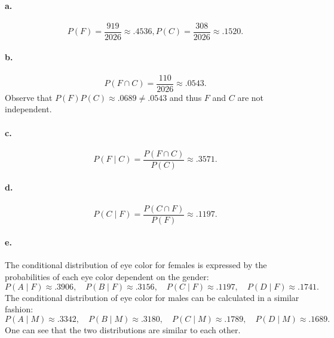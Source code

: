\documentclass{exam}
\begin{document}
\paragraph{a.}
\[
	P(F) = \frac{919}{2026} \approx .4536, P(C) = \frac{308}{2026} \approx .1520.
\]

\paragraph{b.}
\[
	P(F \cap C) = \frac{110}{2026} \approx .0543.
\]
Observe that $P(F)P(C) \approx .0689 \neq .0543$ and thus $F$ and $C$ are not independent.

\paragraph{c.}
\[
	P(F \mid C) = \frac{P(F \cap C)}{P(C)} \approx .3571.
\]

\paragraph{d.}
\[
	P(C \mid F) = \frac{P(C \cap F)}{P(F)} \approx .1197.
\]

\paragraph{e.} The conditional distribution of eye color for females is expressed by the probabilities of each eye color dependent on the gender:
\[
	P(A \mid F) \approx .3906, \quad P(B \mid F) \approx .3156, \quad P(C \mid F) \approx .1197, \quad P(D \mid F) \approx .1741.
\]
The conditional distribution of eye color for males can be calculated in a similar fashion:
\[
	P(A \mid M) \approx .3342, \quad P(B \mid M) \approx .3180, \quad P(C \mid M) \approx .1789, \quad P(D \mid M) \approx .1689.
\]
One can see that the two distributions are similar to each other.
\end{document}
